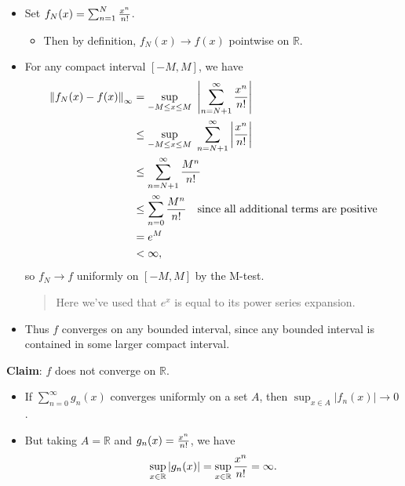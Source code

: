\begin{solution}

\envlist

\begin{itemize}
\item
  Set \(f_N(x) = \sum_{n=1}^N {x^n \over n!}\).

  \begin{itemize}
  \tightlist
  \item
    Then by definition, \(f_N(x) \to f(x)\) pointwise on
    \({\mathbb{R}}\).
  \end{itemize}
\item
  For any compact interval \([-M, M]\), we have
  \begin{align*}
  {\left\lVert {f_N(x) - f(x)} \right\rVert}_\infty
  &= \sup_{-M \leq x \leq M} ~{\left\lvert {\sum_{n=N+1}^\infty {x^n \over {n!}} } \right\rvert} \\
  &\leq \sup_{-M\leq x \leq M} ~\sum_{n=N+1}^\infty {\left\lvert { {x^n \over {n!}} } \right\rvert} \\
  &\leq \sum_{n=N+1}^\infty {M^n \over n!} \\
  &\leq \sum_{n=0}^\infty {M^n \over  {n!} } \quad\text{since all additional terms are positive} \\
  &= e^M \\
  &<\infty
  ,\end{align*}
  so \(f_N \to f\) uniformly on \([-M, M]\) by the M-test.

  \begin{quote}
  Here we've used that \(e^x\) is equal to its power series expansion.
  \end{quote}
\item
  Thus \(f\) converges on any bounded interval, since any bounded
  interval is contained in some larger compact interval.
\end{itemize}

\textbf{Claim}: \(f\) does not converge on \({\mathbb{R}}\).

\begin{itemize}
\tightlist
\item
  If \(\sum_{n=0}^\infty g_n(x)\) converges uniformly on a set \(A\),
  then \(\sup_{x\in A} {\left\lvert {f_n(x)} \right\rvert} \to 0\).
\item
  But taking \(A = {\mathbb{R}}\) and \(g_n(x) = {x^n \over n!}\), we
  have
  \begin{align*}  
  \sup_{x\in {\mathbb{R}}} {\left\lvert {g_n(x)} \right\rvert} = \sup_{x\in {\mathbb{R}}} {x^n \over n!} = \infty
  .\end{align*}
\end{itemize}

\end{solution}

